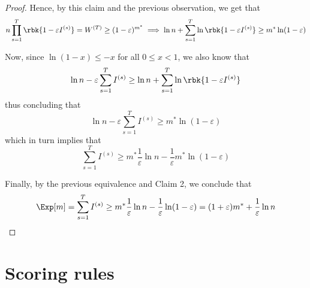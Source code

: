 \documentclass[a4paper, 12pt]{report}
\begin{document}
\begin{proof}
        Hence, by this claim and the previous observation, we get that $$n \prod_{s = 1}^T{ \rbk{1 - \varepsilon I^{(s)}}} = W^{(T)} \ge (1 - \varepsilon) ^{m^*} \implies \ln n + \sum_{s = 1}^T{\ln \rbk{ 1 - \varepsilon I^{(s)}}} \ge m^* \ln (1 - \varepsilon)$$

        Now, since $\ln ( 1- x) \le -x$ for all $0 \le x < 1$, we also know that $$\ln n - \varepsilon \sum_{s = 1}^T{I^{(s)}} \ge \ln n + \sum_{s = 1}^T{\ln \rbk{1 - \varepsilon I^{(s)}}}$$ thus concluding that $$\ln n - \varepsilon \sum_{s = 1}^T{I^{(s)}} \ge m^* \ln (1 - \varepsilon)$$ which in turn implies that $$\sum_{s = 1}^T{I^{(s)}} \ge m^* \dfrac{1}{\varepsilon} \ln n - \dfrac{1}{\varepsilon} m^* \ln (1 - \varepsilon)$$


        Finally, by the previous equivalence and Claim 2, we conclude that $$\Exp[m] = \sum_{s= 1}^T{I^{(s)}} \ge m^* \dfrac{1}{\varepsilon} \ln n - \dfrac{1}{\varepsilon} \ln (1 - \varepsilon)  = (1 + \varepsilon) m^* + \dfrac{1}{\varepsilon} \ln n$$
    \end{proof}

    \section{Scoring rules}
\end{document}
